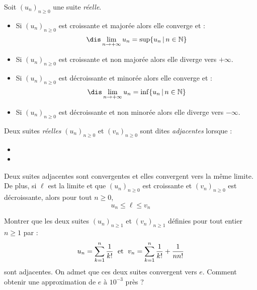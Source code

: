 \documentclass[a4paper,10pt]{report}
\begin{document}
\begin{thm} Soit $(u_n)_{n \geq 0}$ une suite \textit{réelle}.


\begin{itemize}
\item Si $(u_n)_{n \geq 0}$ est croissante et majorée alors elle converge et :
$$\dis \lim_{n \rightarrow + \infty} u_n = \sup \lbrace u_n \, \vert \, n \in \mathbb{N} \rbrace $$
\item Si $(u_n)_{n \geq 0}$ est croissante et non majorée alors elle diverge vers $+ \infty$.
\item Si $(u_n)_{n \geq 0}$ est décroissante et minorée alors elle converge et :
$$\dis \lim_{n \rightarrow + \infty} u_n = \inf \lbrace u_n \, \vert \, n \in \mathbb{N} \rbrace $$
\item Si $(u_n)_{n \geq 0}$ est décroissante et non minorée alors elle diverge vers $- \infty$.
\end{itemize}
\end{thm}

\begin{defin}
Deux suites \textit{réelles} $(u_n)_{n \geq 0}$ et $(v_n)_{n \geq 0}$ sont dites \textit{adjacentes} lorsque :
\begin{itemize}
\item
\item 
\end{itemize}
\end{defin}

\begin{thm}
Deux suites adjacentes sont convergentes et elles convergent vers la même limite. De plus, si $\ell$ est la limite et que $(u_n)_{n \geq 0}$ est croissante et $(v_n)_{n \geq 0}$ est décroissante, alors pour tout $n \geq 0$,
$$ u_n \leq \ell \leq v_n $$
\end{thm}

\begin{exa} Montrer que les deux suites $(u_n)_{n \geq 1}$ et $(v_n)_{n \geq 1}$ définies pour tout entier $n \geq 1$ par :
\[ u_n = \sum_{k=1}^n \frac{1}{k!} \; \hbox{ et } \; v_n = \sum_{k=1}^n \frac{1}{k!} + \frac{1}{n n!} \]
sont adjacentes. On admet que ces deux suites convergent vers $e$. Comment obtenir une approximation de $e$ à $10^{-3}$ près ?
\end{exa}
\end{document}

